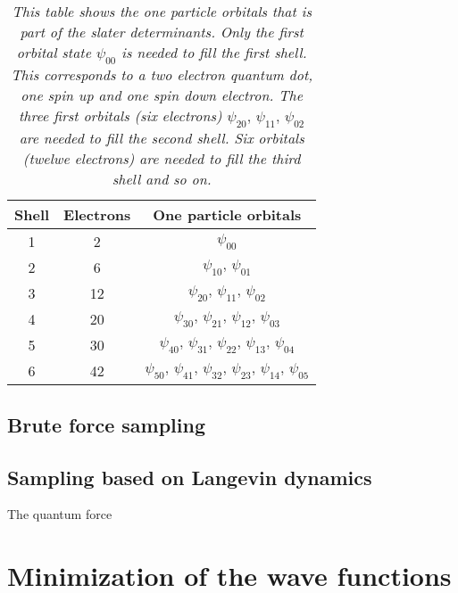 \documentclass[a4paper,10pt,twocolumn]{article} %
\begin{document}
\begin{table}
\begin{center}
\begin{tabular}{|c|c|c|}
\hline
Shell& Electrons & One particle orbitals \\
\hline
1&2& $\psi_{00}$ \\
2&6& $\psi_{10},\,\psi_{01}$\\
3&12& $\psi_{20},\,\psi_{11},\,\psi_{02}$\\
4&20& $\psi_{30},\,\psi_{21},\,\psi_{12},\,\psi_{03}$\\
5&30& $\psi_{40},\,\psi_{31},\,\psi_{22},\,\psi_{13},\,\psi_{04}$\\
6&42& $\psi_{50},\,\psi_{41},\,\psi_{32},\,\psi_{23},\,\psi_{14},\,\psi_{05}$\\
\hline
\end{tabular}
\caption{\it 
	This table shows the one particle orbitals that is part of the slater determinants. Only the first orbital state $\psi_{00}$ 
	is needed to fill the first shell. This corresponds to a two electron quantum dot, one spin up and one spin down electron. The
	three first orbitals (six electrons) $\psi_{20},\,\psi_{11},\,\psi_{02}$ are needed to fill the second shell. Six orbitals (twelwe electrons) are needed to fill the third shell and so on.
\label{tab:orb}
}
\label{tab0}
\end{center}
\end{table}




\subsection{Brute force sampling}%


\subsection{Sampling based on Langevin dynamics}%
The quantum force



\section{Minimization of the wave functions}%
\end{document}
